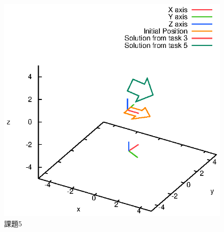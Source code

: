 \documentclass[a4paper,10pt]{jsarticle}
\begin{document}
\begin{figure}[htb]
  \begin{center}
    \includegraphics[clip,width=14cm]{fig/eps/5.eps}
  \end{center}
  \caption{課題5}
  \label{fig:課題5}
\end{figure}
\end{document}

